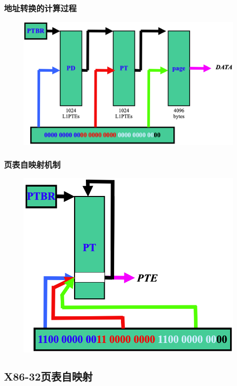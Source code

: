 % 
% 
% 
\begin{frame}
    \frametitle{地址转换的计算过程}
    \begin{figure}
    \includegraphics[width=0.75\linewidth]{figs/addr-translation.png}
    \end{figure}
\end{frame}
% 
% 
% 
\begin{frame}
    \frametitle{页表自映射机制}
    \begin{figure}
    \includegraphics[width=0.55\linewidth]{figs/self-mapping-PTE.png}
    \end{figure}
\end{frame}
% 
\subsection{X86-32页表自映射} %


